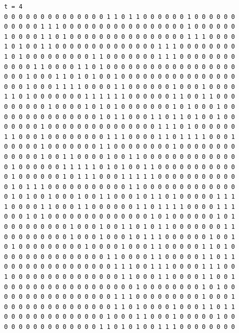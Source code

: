 \documentclass[a4paper,12pt]{article}
\begin{document}
\begin{verbatim}
t = 4
0 0 0 0 0 0 0 0 0 0 0 0 0 0 1 1 0 1 1 0 0 0 0 0 0 1 0 0 0 0 0 0 
0 0 0 0 0 1 1 1 0 0 0 0 0 0 0 0 0 0 0 0 0 0 0 0 0 1 0 0 0 0 0 0 
1 0 0 0 0 1 1 0 1 0 0 0 0 0 0 0 0 0 0 0 0 0 0 0 0 1 1 1 0 0 0 0 
1 0 1 0 0 1 1 0 0 0 0 0 0 0 0 0 0 0 0 0 0 1 1 1 0 0 0 0 0 0 0 0 
1 0 1 0 0 0 0 0 0 0 0 0 1 1 0 0 0 0 0 0 0 1 1 1 0 0 0 0 0 0 0 0 
0 0 0 0 1 1 0 0 0 0 1 1 0 1 0 0 0 0 0 0 0 0 0 0 0 0 0 0 0 0 0 0 
0 0 0 1 0 0 0 1 1 0 1 0 1 0 0 1 0 0 0 0 0 0 0 0 0 0 0 0 0 0 0 0 
0 0 0 1 0 0 0 1 1 1 1 0 0 0 0 1 1 0 0 0 0 0 0 1 0 0 0 1 0 0 0 0 
1 1 0 1 0 0 0 0 0 0 0 1 1 1 1 1 1 0 0 0 0 0 0 1 1 0 0 1 1 0 0 0 
0 0 0 0 0 0 1 0 0 0 0 1 0 1 0 1 0 0 0 0 0 0 0 1 0 1 0 0 0 1 0 0 
0 0 0 0 0 0 0 0 0 0 0 0 0 1 0 1 1 0 0 0 1 1 0 1 1 0 1 0 0 1 0 0 
0 0 0 0 0 1 0 0 0 0 0 0 0 0 0 0 0 0 0 0 0 1 1 1 0 1 0 0 0 0 0 0 
1 1 0 0 0 1 0 0 0 0 0 0 0 0 1 1 1 0 0 0 0 1 1 0 1 1 1 1 0 0 0 1 
0 0 0 0 0 1 0 0 0 0 0 0 0 1 1 0 0 0 0 0 0 0 0 1 0 0 0 0 0 0 0 0 
0 0 0 0 0 1 0 0 1 1 0 0 0 0 1 0 0 1 1 0 0 0 0 0 0 0 0 0 0 0 0 0 
0 1 0 0 0 0 0 0 1 1 1 1 1 0 1 0 1 0 0 1 1 0 0 0 0 0 0 0 0 0 0 0 
0 1 0 0 0 0 0 0 1 0 1 1 1 0 0 0 1 1 1 1 1 0 0 0 0 0 0 0 0 0 0 0 
0 1 0 1 1 1 0 0 0 0 0 0 0 0 0 0 0 1 1 0 0 0 0 0 0 0 0 0 0 0 0 0 
0 1 0 1 0 0 1 0 0 0 1 0 0 1 1 0 0 0 1 0 1 1 0 1 0 0 0 0 0 1 1 1 
1 0 0 0 0 1 1 0 0 0 1 1 0 0 0 0 0 0 1 1 0 1 1 1 1 0 0 0 0 1 1 1 
0 0 0 1 0 1 0 0 0 0 0 0 0 0 0 0 0 0 0 0 1 0 1 0 0 0 0 0 0 1 0 1 
0 0 0 0 0 0 0 0 0 1 0 0 0 1 0 0 1 1 0 1 0 1 1 0 0 0 0 0 0 0 1 1 
0 0 0 0 0 0 0 0 0 1 0 0 0 1 0 0 0 1 0 1 1 1 0 0 0 0 0 0 1 0 0 1 
0 1 0 0 0 0 0 0 0 0 0 1 0 0 0 0 1 0 0 0 1 1 0 0 0 0 0 1 1 0 1 0 
0 0 0 0 0 0 0 0 0 0 0 0 0 0 1 1 0 0 0 0 1 1 0 0 0 0 0 1 1 0 1 1 
0 0 0 0 0 0 0 0 0 0 0 0 0 0 0 1 1 1 0 0 1 1 1 0 0 0 0 1 1 1 0 0 
1 0 0 0 0 0 0 0 0 0 0 0 0 0 0 0 1 1 0 0 0 1 1 0 0 0 0 1 1 0 0 1 
0 0 0 0 0 0 0 0 0 0 0 0 0 0 0 0 0 0 1 0 0 0 0 0 0 0 0 1 0 1 0 0 
0 0 0 0 0 0 0 0 0 0 0 0 0 0 0 1 1 1 0 0 0 0 0 0 0 0 0 1 0 0 0 1 
0 0 0 0 0 0 0 0 0 0 0 0 0 0 0 1 1 0 1 0 0 0 0 1 0 0 0 1 1 0 1 1 
0 0 0 0 0 0 0 0 0 0 0 0 0 0 1 0 0 0 1 1 0 0 0 1 0 0 0 0 0 1 0 0 
0 0 0 0 0 0 0 0 0 0 0 0 0 1 1 0 1 0 1 0 0 1 1 1 0 0 0 0 0 0 0 0 




\end{verbatim}
\end{document}
